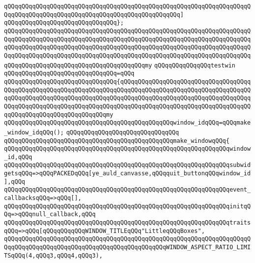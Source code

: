\verb|qQQqqQQqqQQqqQQqqQQqqQQqqQQqqQQqqQQqqQQqqQQqqQQqqQQqqQQqqQQqqQQqqQQqqQQqqQQqqQQqqQQqqQQqqQQqqQQqqQQqqQQqqQQqqQQqqQQqqQQq]|\newline
\verb|qQQqqQQqqQQqqQQqqQQqqQQqqQQqqQQq};|\newline
\newline
\verb|qQQqqQQqqQQqqQQqqQQqqQQqqQQqqQQqqQQqqQQqqQQqqQQqqQQqqQQqqQQqqQQqqQQqqQQqqQQqqQQqqQQqqQQqqQQqqQQqqQQqqQQqqQQqqQQqqQQqqQQqqQQqqQQqqQQqqQQqqQQqqQQqqQQqqQQqqQQqqQQqqQQqqQQqqQQqqQQqqQQqqQQqqQQqqQQqqQQqqQQqqQQqqQQqqQQqqQQqqQQqqQQqqQQqqQQqqQQqqQQqqQQqqQQqqQQqqQQqqQQqqQQqqQQqqQQqqQQqqQQqqQQqqQQqqQQqqQQqqQQqqQQqqQQqqQQqqQQqqQQqmy|\newline
\verb|qQQqqQQqqQQqqQQqtestwin|\newline
\verb|qQQqqQQqqQQqqQQqqQQqqQQqqQQqqQQq=qQQq|\newline
\verb|qQQqqQQqqQQqqQQqqQQqqQQqqQQqqQQq{qQQqqQQqqQQqqQQqqQQqqQQqqQQqqQQqqQQqqQQqqQQqqQQqqQQqqQQqqQQqqQQqqQQqqQQqqQQqqQQqqQQqqQQqqQQqqQQqqQQqqQQqqQQqqQQqqQQqqQQqqQQqqQQqqQQqqQQqqQQqqQQqqQQqqQQqqQQqqQQqqQQqqQQqqQQqqQQqqQQqqQQqqQQqqQQqqQQqqQQqqQQqqQQqqQQqqQQqqQQqqQQqqQQqqQQqqQQqqQQqqQQqqQQqqQQqqQQqqQQqqQQqqQQqqQQqqQQqmy|\newline
\verb|qQQqqQQqqQQqqQQqqQQqqQQqqQQqqQQqqQQqqQQqqQQqqQQqwindow_idqQQq=qQQqmake_window_idqQQq();|\newline
\verb|qQQqqQQqqQQqqQQqqQQqqQQqqQQqqQQq|\newline
\verb|qQQqqQQqqQQqqQQqqQQqqQQqqQQqqQQqqQQqqQQqqQQqqQQqmake_windowqQQq{|\newline
\verb|qQQqqQQqqQQqqQQqqQQqqQQqqQQqqQQqqQQqqQQqqQQqqQQqqQQqqQQqqQQqqQQqwindow_id,qQQq|\newline
\verb|qQQqqQQqqQQqqQQqqQQqqQQqqQQqqQQqqQQqqQQqqQQqqQQqqQQqqQQqqQQqqQQqsubwidgetsqQQq=>qQQqPACKEDqQQq[ye_auld_canvasse,qQQqquit_buttonqQQqwindow_id],qQQq|\newline
\verb|qQQqqQQqqQQqqQQqqQQqqQQqqQQqqQQqqQQqqQQqqQQqqQQqqQQqqQQqqQQqqQQqevent_callbacksqQQq=>qQQq[],|\newline
\verb|qQQqqQQqqQQqqQQqqQQqqQQqqQQqqQQqqQQqqQQqqQQqqQQqqQQqqQQqqQQqqQQqinitqQQq=>qQQqnull_callback,qQQq|\newline
\verb|qQQqqQQqqQQqqQQqqQQqqQQqqQQqqQQqqQQqqQQqqQQqqQQqqQQqqQQqqQQqqQQqtraitsqQQq=>qQQq[qQQqqQQqqQQqWINDOW_TITLEqQQq"LittleqQQqBoxes",|\newline
\verb|qQQqqQQqqQQqqQQqqQQqqQQqqQQqqQQqqQQqqQQqqQQqqQQqqQQqqQQqqQQqqQQqqQQqqQQqqQQqqQQqqQQqqQQqqQQqqQQqqQQqqQQqqQQqqQQqqQQqWINDOW_ASPECT_RATIO_LIMITSqQQq(4,qQQq3,qQQq4,qQQq3),|\newline
